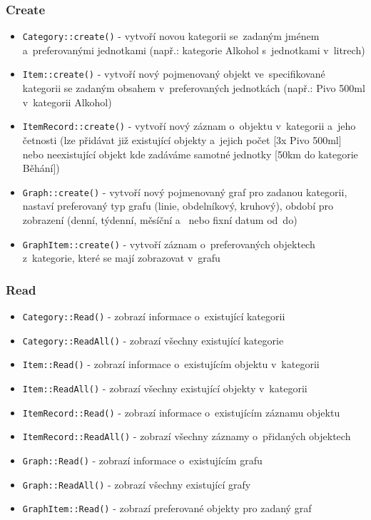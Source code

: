 \documentclass[12pt, titlepage]{article}
\begin{document}
	\subsubsection{Create}
\begin{itemize}
	\item \texttt{Category::create()} - vytvoří novou kategorii se~zadaným jménem a~preferovanými jednotkami (např.: kategorie Alkohol s~jednotkami v~litrech)
	\item \texttt{Item::create()} - vytvoří nový pojmenovaný objekt ve~specifikované kategorii se zadaným obsahem v~preferovaných jednotkách (např.: Pivo 500ml v~kategorii Alkohol)
	\item \texttt{ItemRecord::create()} - vytvoří nový záznam o~objektu v~kategorii a~jeho četnosti (lze přidávat již existující objekty a~jejich počet [3x Pivo 500ml] nebo neexistující objekt kde zadáváme samotné jednotky [50km do kategorie Běhání])
	\item \texttt{Graph::create()} - vytvoří nový pojmenovaný graf pro zadanou kategorii, nastaví preferovaný typ grafu (linie, obdelníkový, kruhový), období pro zobrazení (denní, týdenní, měsíční a~ nebo fixní datum od~do)
	\item \texttt{GraphItem::create()} - vytvoří záznam o~preferovaných objektech z~kategorie, které se mají zobrazovat v~grafu
\end{itemize}

	\subsubsection{Read}
\begin{itemize}
	\item \texttt{Category::Read()} - zobrazí informace o~existující kategorii
	\item \texttt{Category::ReadAll()} - zobrazí všechny existující kategorie
	\item \texttt{Item::Read()} - zobrazí informace o~existujícím objektu v~kategorii
	\item \texttt{Item::ReadAll()} - zobrazí všechny existující objekty v~kategorii
	\item \texttt{ItemRecord::Read()} - zobrazí informace o~existujícím záznamu objektu
	\item \texttt{ItemRecord::ReadAll()} - zobrazí všechny záznamy o~přidaných objektech
	\item \texttt{Graph::Read()} - zobrazí informace o~existujícím grafu
	\item \texttt{Graph::ReadAll()} - zobrazí všechny existující grafy
	\item \texttt{GraphItem::Read()} - zobrazí preferované objekty pro zadaný graf
\end{itemize}
\end{document}
